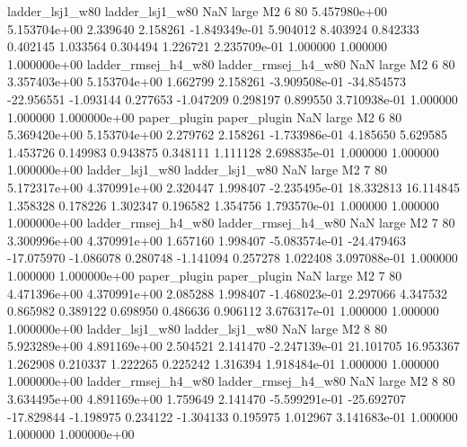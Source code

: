     ladder_lsj1_w80     ladder_lsj1_w80                   NaN      large       M2                 6 80 5.457980e+00   5.153704e+00      2.339640       2.158261 -1.849349e-01      5.904012      8.403924     0.842333       0.402145  1.033564   0.304494     1.226721   2.235709e-01            1.000000        1.000000        1.000000e+00
ladder_rmsej_h4_w80 ladder_rmsej_h4_w80                   NaN      large       M2                 6 80 3.357403e+00   5.153704e+00      1.662799       2.158261 -3.909508e-01    -34.854573    -22.956551    -1.093144       0.277653 -1.047209   0.298197     0.899550   3.710938e-01            1.000000        1.000000        1.000000e+00
       paper_plugin        paper_plugin                   NaN      large       M2                 6 80 5.369420e+00   5.153704e+00      2.279762       2.158261 -1.733986e-01      4.185650      5.629585     1.453726       0.149983  0.943875   0.348111     1.111128   2.698835e-01            1.000000        1.000000        1.000000e+00
    ladder_lsj1_w80     ladder_lsj1_w80                   NaN      large       M2                 7 80 5.172317e+00   4.370991e+00      2.320447       1.998407 -2.235495e-01     18.332813     16.114845     1.358328       0.178226  1.302347   0.196582     1.354756   1.793570e-01            1.000000        1.000000        1.000000e+00
ladder_rmsej_h4_w80 ladder_rmsej_h4_w80                   NaN      large       M2                 7 80 3.300996e+00   4.370991e+00      1.657160       1.998407 -5.083574e-01    -24.479463    -17.075970    -1.086078       0.280748 -1.141094   0.257278     1.022408   3.097088e-01            1.000000        1.000000        1.000000e+00
       paper_plugin        paper_plugin                   NaN      large       M2                 7 80 4.471396e+00   4.370991e+00      2.085288       1.998407 -1.468023e-01      2.297066      4.347532     0.865982       0.389122  0.698950   0.486636     0.906112   3.676317e-01            1.000000        1.000000        1.000000e+00
    ladder_lsj1_w80     ladder_lsj1_w80                   NaN      large       M2                 8 80 5.923289e+00   4.891169e+00      2.504521       2.141470 -2.247139e-01     21.101705     16.953367     1.262908       0.210337  1.222265   0.225242     1.316394   1.918484e-01            1.000000        1.000000        1.000000e+00
ladder_rmsej_h4_w80 ladder_rmsej_h4_w80                   NaN      large       M2                 8 80 3.634495e+00   4.891169e+00      1.759649       2.141470 -5.599291e-01    -25.692707    -17.829844    -1.198975       0.234122 -1.304133   0.195975     1.012967   3.141683e-01            1.000000        1.000000        1.000000e+00
